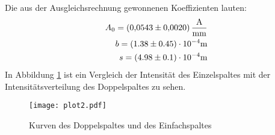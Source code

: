   Die aus der Ausgleichsrechnung gewonnenen Koeffizienten lauten:
  \begin{align*}
    A_0 =  \SI{0.0543 \pm 0.002}{\ampere\per \milli\metre}\\
    b = (1.38 \pm 0.45)\cdot 10^{-4} \si{\metre}\\
    s = (4.98 \pm 0.1) \cdot 10^{-4} \si{\metre}
  \end{align*}
  In Abbildung \ref{fig:verleich} ist ein Vergleich der Intensität des Einzelspaltes mit der 
  Intensitätsverteilung des Doppelspaltes zu sehen.
  \begin{figure}
    \centering
    \texttt{[image: plot2.pdf]}
    \caption{Kurven des Doppelspaltes und des Einfachspaltes}
    \label{fig:verleich}
  \end{figure}